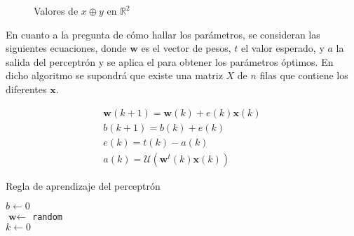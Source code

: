 		\begin{figure}
			\centering
			\caption{Valores de $x \oplus y$ en  $\mathbb{R}^2$}
			\label{fig:xor}
		\end{figure}
		
		En cuanto a la pregunta de cómo hallar los parámetros, se consideran las siguientes ecuaciones\cite{nndesign}, donde $\textbf{w}$ es el vector de pesos, $t$ el valor esperado, y $a$ la salida del perceptrón y se aplica el  para obtener los parámetros óptimos. En dicho algoritmo se supondrá que existe una matriz $X$ de $n$ filas que contiene los diferentes $\textbf{x}$. 
		
		\begin{equation}
			\label{eq:perceptron}
			\begin{gathered}
				\textbf{w}(k+1) = \textbf{w}(k) + e(k)\textbf{x}(k)\\
				b(k+1) = b(k) + e(k)\\
				e(k) = t(k) - a(k)\\
				a(k) = \mathcal{U}(\textbf{w}^t(k)\textbf{x}(k))
			\end{gathered}
		\end{equation}
		
		
		\begin{algorithm}
			\DontPrintSemicolon
			
			\caption{Regla de aprendizaje del perceptrón}
			\label{algo:perceptron}
			
			$b \gets 0$\\
			$\textbf{w} \gets$ \texttt{random}\\
			$k \gets 0$\\
		\end{algorithm}
		
